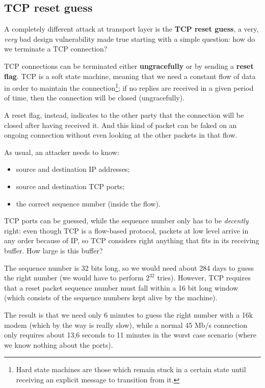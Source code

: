 
\subsection{TCP reset guess}
A completely different attack at transport layer is the \textbf{TCP reset guess}, a very, \textit{very} bad design vulnerability made true starting with a simple question: how do we terminate a TCP connection?

TCP connections can be terminated either \textbf{ungracefully} or by sending a \textbf{reset flag}. TCP is a soft state machine, meaning that we need a constant flow of data in order to maintain the connection\footnote{Hard state machines are those which remain stuck in a certain state until receiving an explicit message to transition from it.}; if no replies are received in a given period of time, then the connection will be closed (ungracefully).

A reset flag, instead, indicates to the other party that the connection will be closed after having received it. And this kind of packet can be faked on an ongoing connection without even looking at the other packets in that flow.

As usual, an attacker needs to know:

\begin{itemize}
	\item source and destination IP addresses;
	\item source and destination TCP ports;
	\item the correct sequence number (inside the flow).
\end{itemize}

TCP ports can be guessed, while the sequence number only has to be \textit{decently} right: even though TCP is a flow-based protocol, packets at low level arrive in any order because of IP, so TCP considers right anything that fits in its receiving buffer. How large is this buffer?
 
The sequence number is 32 bits long, so we would need about 284 days to guess the right number (we would have to perform $2^{32}$ tries). However, TCP requires that a reset packet sequence number must fall within a 16 bit long window (which consists of the sequence numbers kept alive by the machine).

The result is that we need only 6 minutes to guess the right number with a 16k modem (which by the way is really slow), while a normal 45 Mb/s connection only requires about 13,6 seconds to 11 minutes in the worst case scenario (where we know nothing about the ports).

